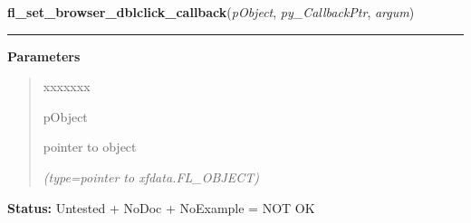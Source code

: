 \hspace{.8\funcindent}\begin{boxedminipage}{\funcwidth}

    \raggedright \textbf{fl\_set\_browser\_dblclick\_callback}(\textit{pObject}, \textit{py\_CallbackPtr}, \textit{argum})

    \vspace{-1.5ex}

    \rule{\textwidth}{0.5\fboxrule}
\setlength{\parskip}{2ex}
\setlength{\parskip}{1ex}
      \textbf{Parameters}
      \vspace{-1ex}

      \begin{quote}
        \begin{Ventry}{xxxxxxx}

          \item[pObject]

          pointer to object

            {\it (type=pointer to xfdata.FL\_OBJECT)}

        \end{Ventry}

      \end{quote}

\textbf{Status:} Untested + NoDoc + NoExample = NOT OK



    \end{boxedminipage}

    \label{xformslib:library:fl_get_browser_xoffset}

    \vspace{0.5ex}

